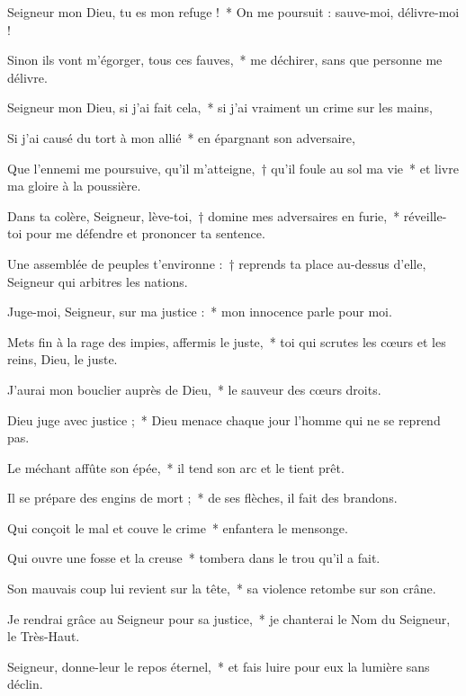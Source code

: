 \item Seigneur mon Dieu, tu es mon refuge !~* On me poursuit : sauve-moi, délivre-moi !

\item Sinon ils vont m'égorger, tous ces fauves,~* me déchirer, sans que personne me délivre.

\item Seigneur mon Dieu, si j'ai fait cela,~* si j'ai vraiment un crime sur les mains,

\item Si j'ai causé du tort à mon allié~* en épargnant son adversaire,

\item Que l'ennemi me poursuive, qu'il m'atteigne,~† qu'il foule au sol ma vie~* et livre ma gloire à la poussière.

\item Dans ta colère, Seigneur, lève-toi,~† domine mes adversaires en furie,~* réveille-toi pour me défendre et prononcer ta sentence.

\item Une assemblée de peuples t'environne :~† reprends ta place au-dessus d'elle, Seigneur qui arbitres les nations.

\item Juge-moi, Seigneur, sur ma justice :~* mon innocence parle pour moi.

\item Mets fin à la rage des impies, affermis le juste,~* toi qui scrutes les cœurs et les reins, Dieu, le juste.

\item J'aurai mon bouclier auprès de Dieu,~* le sauveur des cœurs droits.

\item Dieu juge avec justice ;~* Dieu menace chaque jour l'homme qui ne se reprend pas.

\item Le méchant affûte son épée,~* il tend son arc et le tient prêt.

\item Il se prépare des engins de mort ;~* de ses flèches, il fait des brandons.

\item Qui conçoit le mal et couve le crime~* enfantera le mensonge.

\item Qui ouvre une fosse et la creuse~* tombera dans le trou qu'il a fait.

\item Son mauvais coup lui revient sur la tête,~* sa violence retombe sur son crâne.

\item Je rendrai grâce au Seigneur pour sa justice,~* je chanterai le Nom du Seigneur, le Très-Haut.

\item Seigneur, donne-leur le repos éternel,~* et fais luire pour eux la lumière sans déclin.